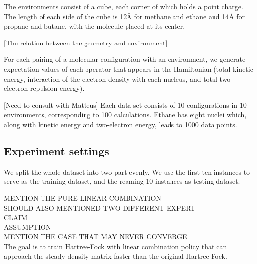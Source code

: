 \documentclass[twoside]{article}
\begin{document}

The environments consist of a cube, each corner of which holds a point charge. The length of each side of the cube is 12Å for methane and ethane and 14Å for propane and butane, with the molecule placed at its center. 

[The relation between the geometry and environment]



For each pairing of a molecular configuration with an environment, we generate expectation values of each operator that appears in the Hamiltonian (total kinetic energy, interaction of the electron density with each nucleus, and total two-electron repulsion energy).

[Need to consult with Matteus]
Each data set consists of 10 configurations in 10 environments, corresponding to 100 calculations. Ethane has eight nuclei which, along with kinetic energy and two-electron energy, leads to 1000 data points. 




\subsection{Experiment settings}



We split the whole dataset into two part evenly. 
We use the first ten instances to serve as the training dataset, and the reaming 10 instances as testing dataset.

MENTION THE PURE LINEAR COMBINATION\\
SHOULD ALSO MENTIONED TWO DIFFERENT EXPERT \\
CLAIM \\ 
ASSUMPTION \\
MENTION THE CASE THAT MAY NEVER CONVERGE \\
The goal is to train Hartree-Fock with linear combination policy that can  approach the steady density matrix faster than the original Hartree-Fock.
\end{document}
